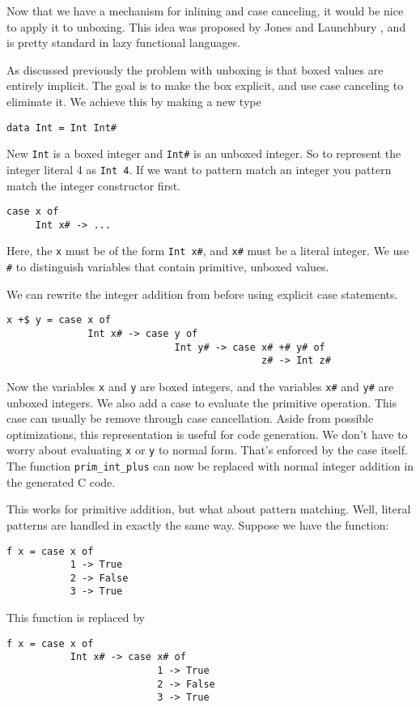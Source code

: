 \documentclass{article}
\begin{document}
Now that we have a mechanism for inlining and case canceling,
it would be nice to apply it to unboxing.
This idea was proposed by Jones and Launchbury \cite{unboxing},
and is pretty standard in lazy functional languages.

As discussed previously the problem with unboxing is that boxed values are entirely implicit.
The goal is to make the box explicit, and use case canceling to eliminate it.
We achieve this by making a new type
\begin{verbatim}
data Int = Int Int#
\end{verbatim}
New \texttt{Int} is a boxed integer and \texttt{Int\#} is an unboxed integer.
So to represent the integer literal 4 as \texttt{Int 4}.
If we want to pattern match an integer you pattern match the integer constructor first.
\begin{verbatim}
case x of
     Int x# -> ...
\end{verbatim}
Here, the \texttt x must be of the form \texttt{Int x\#}, and \texttt{x\#} must be a literal integer.
We use \texttt{\#} to distinguish variables that contain primitive, unboxed values.

We can rewrite the integer addition from before using explicit case statements.
\begin{verbatim}
x +$ y = case x of
              Int x# -> case y of
                             Int y# -> case x# +# y# of
                                            z# -> Int z#
\end{verbatim}

Now the variables \texttt x and \texttt y are boxed integers,
and the variables \texttt{x\#} and \texttt{y\#} are unboxed integers.
We also add a case to evaluate the primitive operation.
This case can usually be remove through case cancellation.
Aside from possible optimizations, this representation is useful for code generation.
We don't have to worry about evaluating \texttt x or \texttt y to normal form.
That's enforced by the case itself.
The function \texttt{prim\_int\_plus} can now be replaced with normal integer addition in the generated C code.

This works for primitive addition, but what about pattern matching.
Well, literal patterns are handled in exactly the same way.
Suppose we have the function:
\begin{verbatim}
f x = case x of
           1 -> True
           2 -> False
           3 -> True
\end{verbatim}

This function is replaced by 
\begin{verbatim}
f x = case x of
           Int x# -> case x# of
                          1 -> True
                          2 -> False
                          3 -> True
\end{verbatim}
\end{document}
